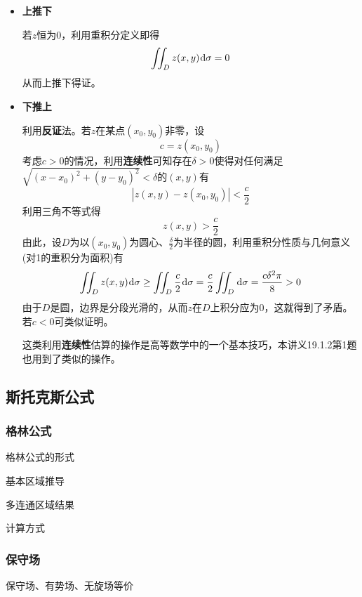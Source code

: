 \documentclass[a4paper,UTF8,fontset=windows,AutoFakeBold]{ctexart}
\newcommand*{\dr}{\hspace{0.07em}\mathrm{d}}
\newcommand*{\note}{\noindent *}
\theoremstyle{ex}
\begin{document}
\begin{enumerate}
{\begin{itemize}
            \note 注意实际上\textbf{无需记忆}本讲义22.1.1第7题(1)的结论，只要掌握了分析方法，本部分结论是可以通过完全相同的方式计算出的。

            由此，第二个命题即等价于对任何边界分段光滑的有界区域$D$有
            $$\iint_D\triangle u\dr\sigma=0$$
            我们接下来记$z(x,y)=\triangle u(x,y)$，由$u$各二阶偏导连续可知$z$连续，此时第一个命题即$z$恒为0，第二个命题即$z$在任何边界分段光滑的有界区域积分为0。

            \item \textbf{上推下}
            
            若$z$恒为0，利用重积分定义即得
            $$\iint_Dz(x,y)\dr\sigma=0$$
            从而上推下得证。

            \item \textbf{下推上}
            
            利用\textbf{反证}法。若$z$在某点$(x_0,y_0)$非零，设
            $$c=z(x_0,y_0)$$
            考虑$c>0$的情况，利用\textbf{连续性}可知存在$\delta>0$使得对任何满足$\sqrt{(x-x_0)^2+(y-y_0)^2}<\delta$的$(x,y)$有
            $$|z(x,y)-z(x_0,y_0)|<\frac{c}{2}$$
            利用三角不等式得
            $$z(x,y)>\frac{c}{2}$$
            由此，设$D$为以$(x_0,y_0)$为圆心、$\frac{\delta}{2}$为半径的圆，利用重积分性质与几何意义(对1的重积分为面积)有
            $$\iint_Dz(x,y)\dr\sigma\ge\iint_D\frac{c}{2}\dr\sigma=\frac{c}{2}\iint_D\dr\sigma=\frac{c\delta^2\pi}{8}>0$$
            由于$D$是圆，边界是分段光滑的，从而$z$在$D$上积分应为0，这就得到了矛盾。若$c<0$可类似证明。

            \note 这类利用\textbf{连续性}估算的操作是高等数学中的一个基本技巧，本讲义19.1.2第1题也用到了类似的操作。
        \end{itemize}
    }
\end{enumerate}

\subsection{斯托克斯公式}
\subsubsection{格林公式}
格林公式的形式

基本区域推导

多连通区域结果

计算方式

\subsubsection{保守场}
保守场、有势场、无旋场等价
\end{document}

